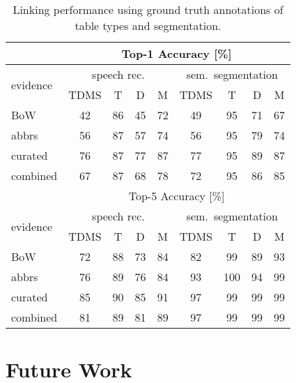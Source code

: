 \documentclass[11pt,a4paper]{article}
\begin{document}
\begin{table}[t]
    \centering
    \setlength{\tabcolsep}{3.5pt}
    \caption{Linking performance using ground truth annotations of table types and segmentation. }
    \small
    \label{tab:results:linking:gold}
\begin{tabular}{lcccccccc}
\toprule
& \multicolumn{8}{c}{Top-1 Accuracy [\%]}\\
\midrule
\multirow{2}{*}{evidence} & \multicolumn{4}{c}{speech rec.} & \multicolumn{4}{c}{sem.\ segmentation} \\
&                TDMS & T & D & M &                   TDMS & T & D & M \\
\cmidrule(lr){2-5}\cmidrule(lr){6-9}
BoW &                 42 &   86 &      45 &     72 &                    49 &   95 &      71 &     67 \\
abbrs    &                 56 &   87 &      57 &     74 &                    56 &   95 &      79 &     74 \\
curated  &                 76 &   87 &      77 &     87 &                    77 &   95 &      89 &     87 \\
combined &                 67 &   87 &      68 &     78 &                    72 &   95 &      86 &     85 \\
\midrule
& \multicolumn{8}{c}{Top-5 Accuracy [\%]}\\
\midrule
\multirow{2}{*}{evidence} & \multicolumn{4}{c}{speech rec.} & \multicolumn{4}{c}{sem.\ segmentation} \\
&                TDMS & T & D & M &                   TDMS & T & D & M \\
\cmidrule(lr){2-5}\cmidrule(lr){6-9}
BoW &                 72 &   88 &      73 &     84 &                    82 &   99 &      89 &     93 \\
abbrs    &                 76 &   89 &      76 &     84 &                    93 &  100 &      94 &     99 \\
curated  &                 85 &   90 &      85 &     91 &                    97 &   99 &      99 &     99 \\
combined &                 81 &   89 &      81 &     89 &                    97 &   99 &      99 &     99 \\
\bottomrule
\end{tabular}
\end{table}


 \section{Future Work}
\end{document}
